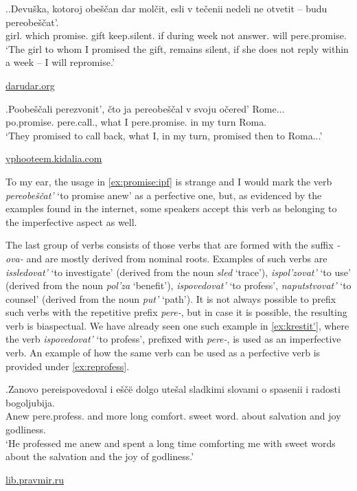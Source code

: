 \ex.\label{ex:promise}\ag.\label{ex:promise:ipf}Devu\v{s}ka, kotoroj obe\v{s}\v{c}an dar mol\v{c}it, esli {v te\v{c}enii} nedeli ne otvetit -- budu pereobe\v{s}\v{c}at'.\\
girl. which promise. gift keep.silent. if during week not answer.  will pere.promise.\\
\trans `The girl to whom I promised the gift, remains silent, if she does not reply within a week -- I will repromise.'
\begin{flushright}
\vspace{-0.5em}
\url{darudar.org}
\end{flushright}
\bg.\label{ex:promise:pf}Poobe\v{s}\v{c}ali perezvonit', \v{c}to ja pereobe\v{s}\v{c}al v svoju o\v{c}ered' Rome...\\
po.promise. pere.call., what I pere.promise. in my turn Roma.\\
\trans `They promised to call back, what I, in my turn, promised then to Roma...'
\begin{flushright}
\vspace{-0.5em}
\url{yphooteem.kidalia.com}
\end{flushright}

To my ear, the usage in \ref{ex:promise:ipf} is strange and I would mark the verb \textit{pereobe\v{s}\v{c}at'} `to promise anew' as a perfective one, but, as evidenced by the examples found in the internet, some speakers accept this verb as belonging to the imperfective aspect as well.

The last group of verbs consists of those verbs that are formed with the suffix \textit{-ova-} and are mostly derived from nominal roots. Examples of such verbs are \textit{issledovat'} `to investigate' (derived from the noun \textit{sled} `trace'), \textit{ispol'zovat'} `to use' (derived from the noun \textit{pol'za} `benefit'), \textit{ispovedovat'} `to profess', \textit{naputstvovat'} `to counsel' (derived from the noun \textit{put'} `path'). It is not always possible to prefix such verbs with the repetitive prefix \textit{pere-}, but in case it is possible, the resulting verb is biaspectual. We have already seen one such example in \ref{ex:krestit'}, where the verb \textit{ispovedovat'} `to profess', prefixed with \textit{pere-}, is used as an imperfective verb. An example of how the same verb can be used as a perfective verb is provided under \ref{ex:reprofess}.

\exg.\label{ex:reprofess}Zanovo pereispovedoval i e\v{s}\v{c}\"{e} dolgo ute\v{s}al sladkimi slovami o spasenii i radosti bogoljubija.\\
Anew pere.profess. and more long comfort. sweet word. about salvation and joy godliness.\\
\trans `He professed me anew and spent a long time comforting me with sweet words about the salvation and the joy of godliness.'
\begin{flushright}
\vspace{-0.5em}
\url{lib.pravmir.ru}
\end{flushright}

